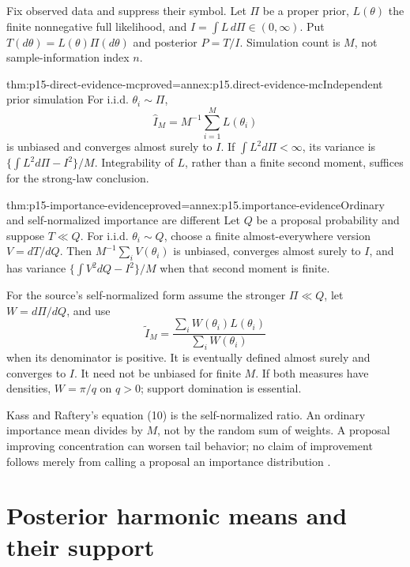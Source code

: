 Fix observed data and suppress their symbol. Let \(\Pi\) be a proper prior,
\(L(\theta)\) the finite nonnegative full likelihood, and
\(I=\int L\,d\Pi\in(0,\infty)\). Put \(T(d\theta)=L(\theta)\Pi(d\theta)\)
and posterior \(P=T/I\). Simulation count is \(M\), not sample-information
index \(n\).

\begin{hbtheorem}{thm:p15-direct-evidence-mc}{proved=annex:p15.direct-evidence-mc}{Independent prior simulation}
For i.i.d. \(\theta_i\sim\Pi\),
\[
 \widehat I_M=M^{-1}\sum_{i=1}^M L(\theta_i)
\]
is unbiased and converges almost surely to \(I\).
If \(\int L^2d\Pi<\infty\), its variance is
\(\{\int L^2d\Pi-I^2\}/M\). Integrability of \(L\), rather than a
finite second moment, suffices for the strong-law conclusion.
\end{hbtheorem}

\begin{hbtheorem}{thm:p15-importance-evidence}{proved=annex:p15.importance-evidence}{Ordinary and self-normalized importance are different}
Let \(Q\) be a proposal probability and suppose \(T\ll Q\).
For i.i.d. \(\theta_i\sim Q\), choose a finite almost-everywhere version
\(V=dT/dQ\). Then \(M^{-1}\sum_iV(\theta_i)\) is unbiased, converges
almost surely to \(I\), and has variance
\(\{\int V^2dQ-I^2\}/M\) when that second moment is finite.

For the source's self-normalized form assume the stronger
\(\Pi\ll Q\), let \(W=d\Pi/dQ\), and use
\[
 \widetilde I_M=
 \frac{\sum_iW(\theta_i)L(\theta_i)}{\sum_iW(\theta_i)}
\]
when its denominator is positive. It is eventually defined almost surely
and converges to \(I\). It need not be unbiased for finite \(M\).
If both measures have densities, \(W=\pi/q\) on \(q>0\);
support domination is essential.
\end{hbtheorem}

Kass and Raftery's equation (10) is the self-normalized ratio. An ordinary
importance mean divides by \(M\), not by the random sum of weights.
A proposal improving concentration can worsen tail behavior; no claim of
improvement follows merely from calling a proposal an importance distribution
\cite[Sec.~4.2]{KassRaftery1995BayesFactors}.

\section{Posterior harmonic means and their support}
\label{sec:p15-harmonic-evidence}

